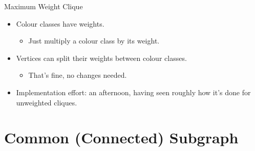 \documentclass{beamer}
\begin{document}
\begin{frame}[fragile]{Maximum Weight Clique}
    \begin{itemize}
        \item Colour classes have weights.
            \begin{itemize}
                \item Just multiply a colour class by its weight.
            \end{itemize}
        \item Vertices can split their weights between colour classes.
            \begin{itemize}
                \item That's fine, no changes needed.
            \end{itemize}
        \item Implementation effort: an afternoon, having seen roughly how it's done for unweighted
            cliques.
    \end{itemize}
\end{frame}

\section{Common (Connected) Subgraph}
\end{document}
